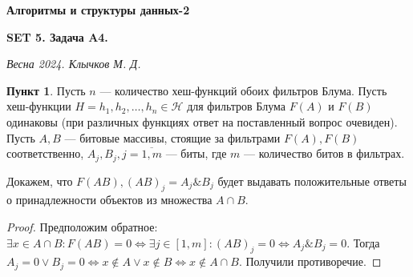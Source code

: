 \documentclass[11pt,a4paper]{scrarticle}
\author{Клычков Максим Дмитриевич}
\theoremstyle{definition}
\newtheorem{subtask}{Пункт}
\begin{document}
\centerline{\textbf{\huge Алгоритмы и структуры данных-2}}
\centerline{\textbf{SET 5. Задача A4.}}
\begin{flushright}
    \emph{Весна 2024. Клычков М. Д.}
\end{flushright}


\begin{subtask}
    Пусть $n$ — количество хеш-функций обоих фильтров Блума. Пусть хеш-функции $H = h_1, h_2, \dots, h_n \in \mathcal{H}$ для фильтров Блума $F(A)$ и $F(B)$ одинаковы (при различных функциях ответ на поставленный вопрос очевиден). Пусть $A, B$ — битовые массивы, стоящие за фильтрами $F(A), F(B)$ соответственно, $A_j, B_j, j = \overline{1, m}$ — биты, где $m$ — количество битов в фильтрах.

    Докажем, что $F(AB), (AB)_j = A_j \& B_j$ будет выдавать положительные ответы о принадлежности объектов из множества $A \cap B$.

    \begin{proof}
        Предположим обратное: $\exists x \in A \cap B \colon F(AB) = 0 \Leftrightarrow \exists j \in [1, m] \colon (AB)_j = 0 \Leftrightarrow  A_j \& B_j = 0$. Тогда $A_j = 0 \lor B_j = 0 \Leftrightarrow x \notin A \lor x \notin B \Leftrightarrow x \notin A \cap B$. Получили противоречие.
    \end{proof}
\end{subtask}
\end{document}
